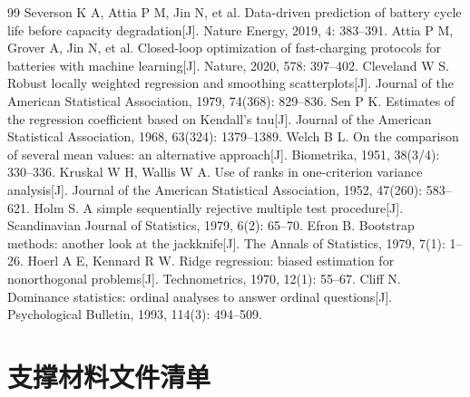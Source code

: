 \documentclass[UTF8,a4paper,zihao=-4]{ctexart}
\begin{document}
\begin{thebibliography}{99}
 Severson K A, Attia P M, Jin N, et al. Data-driven prediction of battery cycle life before capacity degradation[J]. Nature Energy, 2019, 4: 383--391.
 Attia P M, Grover A, Jin N, et al. Closed-loop optimization of fast-charging protocols for batteries with machine learning[J]. Nature, 2020, 578: 397--402.
 Cleveland W S. Robust locally weighted regression and smoothing scatterplots[J]. Journal of the American Statistical Association, 1979, 74(368): 829--836.
 Sen P K. Estimates of the regression coefficient based on Kendall's tau[J]. Journal of the American Statistical Association, 1968, 63(324): 1379--1389.
 Welch B L. On the comparison of several mean values: an alternative approach[J]. Biometrika, 1951, 38(3/4): 330--336.
 Kruskal W H, Wallis W A. Use of ranks in one-criterion variance analysis[J]. Journal of the American Statistical Association, 1952, 47(260): 583--621.
 Holm S. A simple sequentially rejective multiple test procedure[J]. Scandinavian Journal of Statistics, 1979, 6(2): 65--70.
 Efron B. Bootstrap methods: another look at the jackknife[J]. The Annals of Statistics, 1979, 7(1): 1--26.
 Hoerl A E, Kennard R W. Ridge regression: biased estimation for nonorthogonal problems[J]. Technometrics, 1970, 12(1): 55--67.
 Cliff N. Dominance statistics: ordinal analyses to answer ordinal questions[J]. Psychological Bulletin, 1993, 114(3): 494--509.
\end{thebibliography}

\clearpage
\appendix
\section{支撑材料文件清单}
\end{document}
